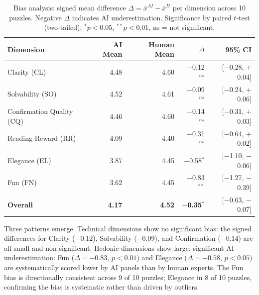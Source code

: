 \begin{table}[htbp]
\centering
\caption{Bias analysis: signed mean difference $\Delta = \bar{x}^{AI} - \bar{x}^{H}$ per dimension across 10 puzzles. Negative $\Delta$ indicates AI underestimation. Significance by paired $t$-test (two-tailed); $^{*}p < 0.05$, $^{**}p < 0.01$, ns = not significant.}
\label{tab:bias}
\begin{tabular}{@{}lrrrr@{}}
\toprule
\textbf{Dimension} & \textbf{AI Mean} & \textbf{Human Mean} & \textbf{$\Delta$} & \textbf{95\% CI} \\
\midrule
Clarity (CL)              & 4.48 & 4.60 & $-$0.12$^{ns}$    & [$-$0.28, $+$0.04] \\
Solvability (SO)          & 4.52 & 4.61 & $-$0.09$^{ns}$    & [$-$0.24, $+$0.06] \\
Confirmation Quality (CQ) & 4.46 & 4.60 & $-$0.14$^{ns}$    & [$-$0.31, $+$0.03] \\
Reading Reward (RR)       & 4.09 & 4.40 & $-$0.31$^{ns}$    & [$-$0.64, $+$0.02] \\
Elegance (EL)             & 3.87 & 4.45 & $-$0.58$^{*}$     & [$-$1.10, $-$0.06] \\
Fun (FN)                  & 3.62 & 4.45 & $-$0.83$^{**}$    & [$-$1.27, $-$0.39] \\
\midrule
\textbf{Overall}          & \textbf{4.17} & \textbf{4.52} & \textbf{$-$0.35$^{*}$} & [$-$0.63, $-$0.07] \\
\bottomrule
\end{tabular}
\end{table}

Three patterns emerge. Technical dimensions show no significant bias: the signed differences for Clarity ($-$0.12), Solvability ($-$0.09), and Confirmation ($-$0.14) are all small and non-significant. Hedonic dimensions show large, significant AI underestimation: Fun ($\Delta = -0.83$, $p < 0.01$) and Elegance ($\Delta = -0.58$, $p < 0.05$) are systematically scored lower by AI panels than by human experts. The Fun bias is directionally consistent across 9 of 10 puzzles; Elegance in 8 of 10 puzzles, confirming the bias is systematic rather than driven by outliers.


